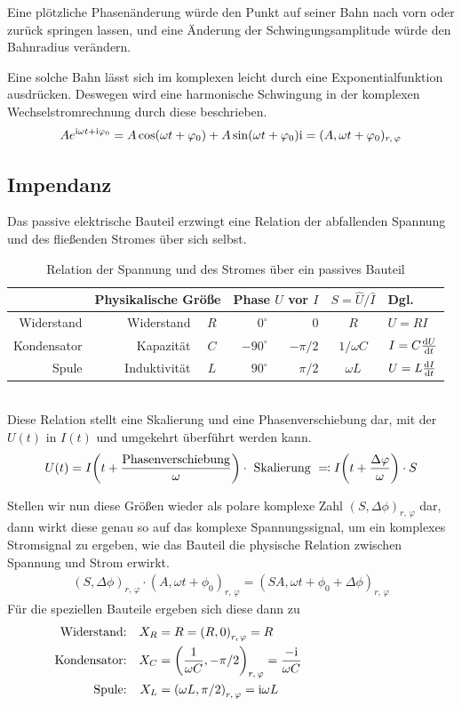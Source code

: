Eine plötzliche Phasenänderung würde den Punkt auf seiner Bahn nach vorn oder zurück springen lassen, und eine Änderung der Schwingungsamplitude würde den Bahnradius verändern.

Eine solche Bahn lässt sich im komplexen leicht durch eine Exponentialfunktion
ausdrücken. Deswegen wird eine harmonische Schwingung in der komplexen Wechselstromrechnung durch diese beschrieben.
$$A e^{\mathrm{i} \omega t + \mathrm{i} \varphi_0} = A\cos(\omega t + \varphi_0) + A\sin(\omega t + \varphi_0)\mathrm{i} = (A,\omega t + \varphi_0)_{r,\,\varphi}$$

\subsection{Impendanz}
Das passive elektrische Bauteil erzwingt eine Relation der abfallenden Spannung und des fließenden Stromes über sich selbst.
\begin{table}[h]
    \centering
    \begin{tabular}{rrcrrcl}
    \toprule 
     & \multicolumn{2}{c}{Physikalische Größe} & \multicolumn{2}{c}{Phase $U$ vor $I$} & $S = \hat{U}/\hat{I}$ & Dgl.\\
    \midrule
    Widerstand  & Widerstand    & $R$ & $0^\circ$   & $0$      & $R$              & $U = RI$ \\
    Kondensator & Kapazität     & $C$ & $-90^\circ$ & $-\pi/2$ & $1/\omega C$     & $I = C \dv{U}{t}$ \\
    Spule       & Induktivität  & $L$ & $90^\circ$  & $\pi/2$  & $\omega L$       & $U = L \dv{I}{t}$ \\
    \bottomrule
    \end{tabular}
    \caption{Relation der Spannung und des Stromes über ein passives Bauteil}
\end{table}\\ 
Diese Relation stellt eine Skalierung und eine Phasenverschiebung dar, mit der $U(t)$ in $I(t)$ 
und umgekehrt überführt werden kann.
$$U(t) = I\qty(t + \frac{\text{Phasenverschiebung}}{\omega}) \cdot \text{ Skalierung } \eqqcolon I\qty(t + \frac{\Delta \varphi}{\omega}) \cdot S$$

Stellen wir nun diese Größen wieder als polare komplexe Zahl $(S,\Delta \phi)_{r,\,\varphi}$ dar, dann wirkt diese genau so auf das komplexe Spannungssignal, um ein komplexes Stromsignal zu ergeben, wie das Bauteil die physische Relation zwischen Spannung und Strom erwirkt.
\begin{align*}
    (S,\Delta \phi)_{r,\,\varphi} \cdot (A,\omega t + \phi_0)_{r,\,\varphi} = (SA,\omega t + \phi_0 + \Delta \phi)_{r,\,\varphi}
\end{align*}
Für die speziellen Bauteile ergeben sich diese dann zu
\begin{align*}
    \text{Widerstand:} && X_R &= R = \qty(R,0)_{r,\,\varphi} = R \\
    \text{Kondensator:} && X_C &= \qty(\frac{1}{\omega C},-\pi/2)_{r,\,\varphi} = \frac{-\imu}{\omega C}\\
    \text{Spule:} && X_L &= \qty(\omega L,\pi/2)_{r,\,\varphi} = \imu \omega L \phantom{\hspace*{3cm}fff}
\end{align*}

